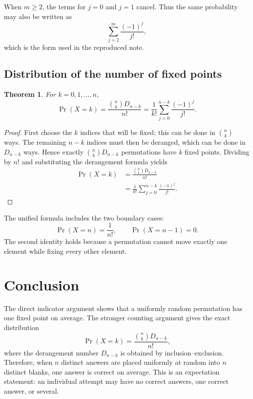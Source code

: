 \documentclass[11pt,a4paper]{article}
\newtheorem{theorem}{Theorem}
\begin{document}
When \(m\geq 2\), the terms for \(j=0\) and \(j=1\) cancel. Thus the same
probability may also be written as
\[
  \sum_{j=2}^{m}\frac{(-1)^j}{j!},
\]
which is the form used in the reproduced note.

\subsection{Distribution of the number of fixed points}

\begin{theorem}
For \(k=0,1,\ldots,n\),
\[
  \Pr(X=k)
    =\frac{\binom{n}{k}D_{n-k}}{n!}
    =\frac{1}{k!}\sum_{j=0}^{n-k}\frac{(-1)^j}{j!}.
\]
\end{theorem}

\begin{proof}
First choose the \(k\) indices that will be fixed; this can be done in
\(\binom{n}{k}\) ways. The remaining \(n-k\) indices must then be deranged,
which can be done in \(D_{n-k}\) ways. Hence exactly
\(\binom{n}{k}D_{n-k}\) permutations have \(k\) fixed points. Dividing by
\(n!\) and substituting the derangement formula yields
\begin{align*}
  \Pr(X=k)
    &=\frac{\binom{n}{k}D_{n-k}}{n!}\\
    &=\frac{1}{k!}
      \sum_{j=0}^{n-k}\frac{(-1)^j}{j!}.
\end{align*}
\end{proof}

The unified formula includes the two boundary cases:
\[
  \Pr(X=n)=\frac{1}{n!},
  \qquad
  \Pr(X=n-1)=0.
\]
The second identity holds because a permutation cannot move exactly one
element while fixing every other element.

\section{Conclusion}

The direct indicator argument shows that a uniformly random permutation has
one fixed point on average. The stronger counting argument gives the exact
distribution
\[
  \Pr(X=k)=\frac{\binom{n}{k}D_{n-k}}{n!},
\]
where the derangement number \(D_{n-k}\) is obtained by
inclusion--exclusion. Therefore, when \(n\) distinct answers are placed
uniformly at random into \(n\) distinct blanks, one answer is correct on
average. This is an expectation statement: an individual attempt may have
no correct answers, one correct answer, or several.
\end{document}
